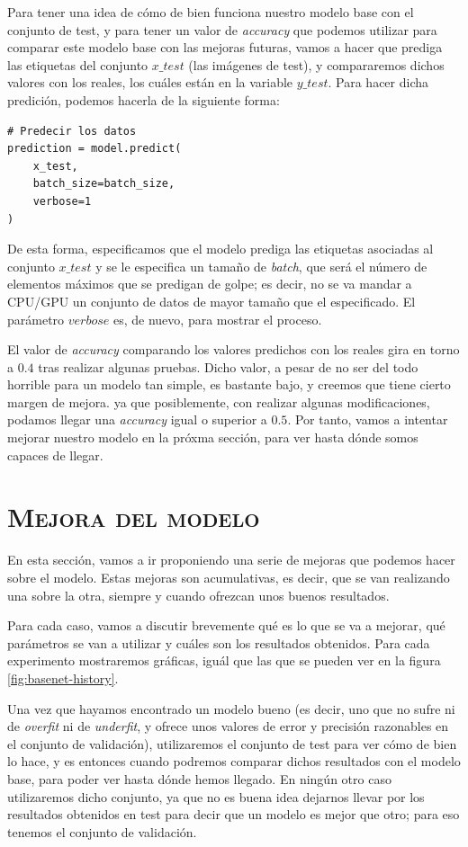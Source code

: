 \documentclass[11pt,a4paper]{article}
\begin{document}
Para tener una idea de cómo de bien funciona nuestro modelo base con el conjunto de test, y para tener un valor de
\textit{accuracy} que podemos utilizar para comparar este modelo base con las mejoras futuras, vamos a hacer que prediga
las etiquetas del conjunto $x\_test$ (las imágenes de test), y compararemos dichos valores con los reales, los cuáles están
en la variable $y\_test$. Para hacer dicha predición, podemos hacerla de la siguiente forma:

\begin{lstlisting}
# Predecir los datos
prediction = model.predict(
    x_test,
    batch_size=batch_size,
    verbose=1
)
\end{lstlisting}

De esta forma, especificamos que el modelo prediga las etiquetas asociadas al conjunto $x\_test$ y se le especifica un tamaño
de \textit{batch}, que será el número de elementos máximos que se predigan de golpe; es decir, no se va mandar a CPU/GPU un
conjunto de datos de mayor tamaño que el especificado. El parámetro $verbose$ es, de nuevo, para mostrar el proceso.

El valor de \textit{accuracy} comparando los valores predichos con los reales gira en torno a $0.4$ tras realizar
algunas pruebas. Dicho valor, a pesar de no ser del todo horrible para un modelo tan simple, es bastante bajo, y creemos
que tiene cierto margen de mejora. ya que posiblemente, con realizar algunas modificaciones, podamos llegar una \textit{accuracy}
igual o superior a $0.5$. Por tanto, vamos a intentar mejorar nuestro modelo en la próxma sección,
para ver hasta dónde somos capaces de llegar.

\section{\textsc{Mejora del modelo}}

En esta sección, vamos a ir proponiendo una serie de mejoras que podemos hacer sobre el modelo. Estas mejoras son acumulativas,
es decir, que se van realizando una sobre la otra, siempre y cuando ofrezcan unos buenos resultados.

Para cada caso, vamos a discutir brevemente qué es lo que se va a mejorar, qué parámetros se van a utilizar y cuáles son los
resultados obtenidos. Para cada experimento mostraremos gráficas, iguál que las que se pueden ver en la figura
\ref{fig:basenet-history}.

Una vez que hayamos encontrado un modelo bueno (es decir, uno que no sufre ni de \textit{overfit} ni de \textit{underfit}, y
ofrece unos valores de error y precisión razonables en el conjunto de validación), utilizaremos el conjunto de test para
ver cómo de bien lo hace, y es entonces cuando podremos comparar dichos resultados con el modelo base, para poder ver hasta
dónde hemos llegado. En ningún otro caso utilizaremos dicho conjunto, ya que no es buena idea dejarnos llevar por los resultados
obtenidos en test para decir que un modelo es mejor que otro; para eso tenemos el conjunto de validación.
\end{document}
